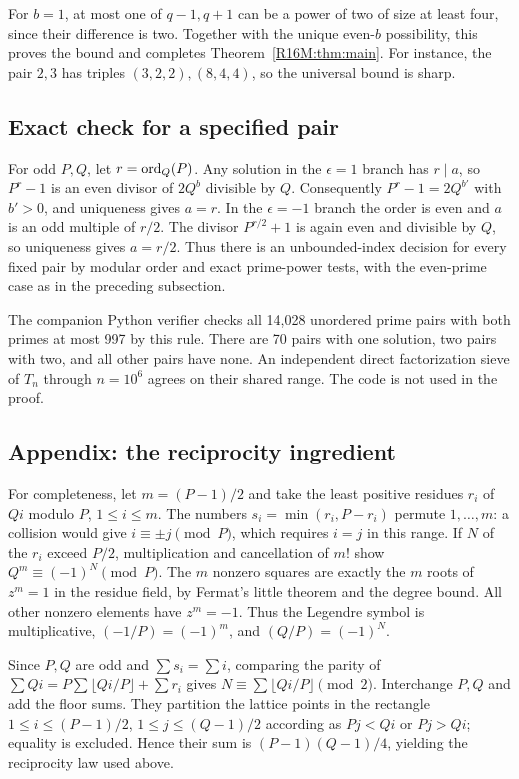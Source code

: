 \documentclass[11pt,a4paper]{article}
\begin{document}
For $b=1$, at most one of $q-1,q+1$ can be a power
of two of size at least four, since their difference is two.
Together with the unique even-$b$ possibility, this proves
the bound and completes Theorem~\ref{R16M:thm:main}. For instance,
the pair $2,3$ has triples $(3,2,2),(8,4,4)$, so the
universal bound is sharp.

\subsection{Exact check for a specified pair}
For odd $P,Q$, let $r=\operatorname{ord}_Q(P)$. Any solution in the
$\epsilon=1$ branch has $r\mid a$, so $P^r-1$ is an even divisor
of $2Q^b$ divisible by $Q$. Consequently $P^r-1=2Q^{b'}$
with $b'>0$, and uniqueness gives $a=r$. In the
$\epsilon=-1$ branch the order is even and $a$ is an odd
multiple of $r/2$. The divisor $P^{r/2}+1$ is again even
and divisible by $Q$, so uniqueness gives $a=r/2$.
Thus there is an unbounded-index decision for every fixed pair
by modular order and exact prime-power tests, with the even-prime
case as in the preceding subsection.

The companion Python verifier checks all 14,028 unordered prime
pairs with both primes at most 997 by this rule. There are 70
pairs with one solution, two pairs with two, and all other pairs
have none. An independent direct factorization sieve of
$T_n$ through $n=10^6$ agrees on their shared range.
The code is not used in the proof.


\subsection*{Appendix: the reciprocity ingredient}
For completeness, let $m=(P-1)/2$ and take the least positive
residues $r_i$ of $Qi$ modulo $P$, $1\le i\le m$.
The numbers $s_i=\min(r_i,P-r_i)$ permute $1,\ldots,m$:
a collision would give $i\equiv\pm j\pmod P$, which requires
$i=j$ in this range. If $N$ of the $r_i$ exceed $P/2$,
multiplication and cancellation of $m!$ show
$Q^m\equiv(-1)^N\pmod P$. The $m$ nonzero squares are exactly
the $m$ roots of $z^m=1$ in the residue field, by Fermat's
little theorem and the degree bound. All other nonzero elements
have $z^m=-1$. Thus the Legendre symbol is multiplicative,
$(-1/P)=(-1)^m$, and $(Q/P)=(-1)^N$.

Since $P,Q$ are odd and $\sum s_i=\sum i$, comparing the parity
of $\sum Qi=P\sum\lfloor Qi/P\rfloor+\sum r_i$ gives
$N\equiv\sum\lfloor Qi/P\rfloor\pmod2$.
Interchange $P,Q$ and add the floor sums. They partition the
lattice points in the rectangle
$1\le i\le(P-1)/2$, $1\le j\le(Q-1)/2$ according as
$Pj<Qi$ or $Pj>Qi$; equality is excluded. Hence their sum
is $(P-1)(Q-1)/4$, yielding the reciprocity law used above.
\endgroup
\end{document}
